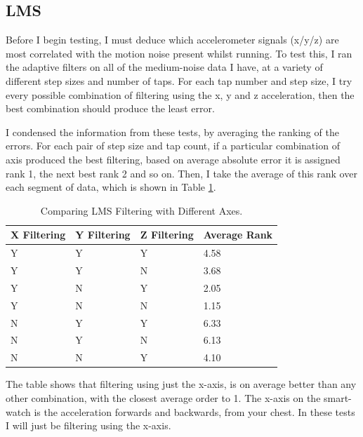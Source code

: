 \documentclass[12pt,a4paper,twoside,openany]{report}
\begin{document}
\subsection{LMS}

Before I begin testing, I must deduce which accelerometer signals (x/y/z) are
most correlated with the motion noise present whilst running. To test this, I
ran the adaptive filters on all of the
medium-noise data I have, at a variety of different step sizes and number of
taps. For each
tap number and step size, I try every possible combination of filtering using
the x, y and
z acceleration, then the best combination should produce the least error. 

I condensed the information from these tests, by averaging the ranking of the
errors.
For each pair of step size and tap count, if a particular combination of axis
produced the best filtering, based on average absolute
error it is assigned rank 1, the next best rank 2 and so on. Then, I take the
average 
of this rank over each segment of data, which is shown in Table \ref{table:lms-errors}.

\begin{table}[]
\centering
\caption{Comparing LMS Filtering with Different Axes.}
\label{table:lms-errors}
\begin{tabular}{|l|l|l|l|}
\hline
X Filtering & Y Filtering & Z Filtering & Average Rank \\ \hline
Y           & Y           & Y           & 4.58          \\
Y           & Y           & N           & 3.68          \\
Y           & N           & Y           & 2.05          \\
Y           & N           & N           & 1.15          \\
N           & Y           & Y           & 6.33          \\
N           & Y           & N           & 6.13          \\
N           & N           & Y           & 4.10          \\
\hline
\end{tabular}
\end{table}

The table shows that filtering using just the x-axis, is on average better
than any other combination, with the closest average order to 1. The x-axis on
the smart-watch is the acceleration forwards and backwards, from your chest.
In these tests I will just be filtering using the x-axis.
\end{document}
